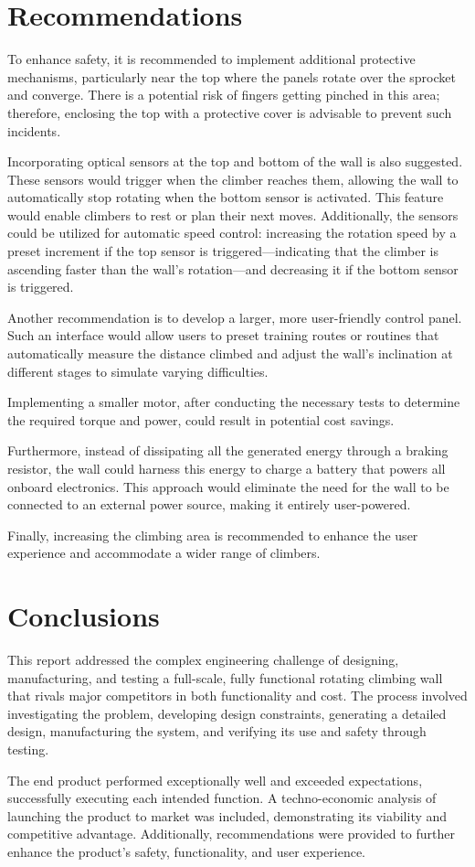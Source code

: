 \chapter{Recommendations}

To enhance safety, it is recommended to implement additional protective mechanisms, particularly near the top where the panels rotate over the sprocket and converge. There is a potential risk of fingers getting pinched in this area; therefore, enclosing the top with a protective cover is advisable to prevent such incidents.

Incorporating optical sensors at the top and bottom of the wall is also suggested. These sensors would trigger when the climber reaches them, allowing the wall to automatically stop rotating when the bottom sensor is activated. This feature would enable climbers to rest or plan their next moves. Additionally, the sensors could be utilized for automatic speed control: increasing the rotation speed by a preset increment if the top sensor is triggered—indicating that the climber is ascending faster than the wall's rotation—and decreasing it if the bottom sensor is triggered.

Another recommendation is to develop a larger, more user-friendly control panel. Such an interface would allow users to preset training routes or routines that automatically measure the distance climbed and adjust the wall's inclination at different stages to simulate varying difficulties.

Implementing a smaller motor, after conducting the necessary tests to determine the required torque and power, could result in potential cost savings.

Furthermore, instead of dissipating all the generated energy through a braking resistor, the wall could harness this energy to charge a battery that powers all onboard electronics. This approach would eliminate the need for the wall to be connected to an external power source, making it entirely user-powered.

Finally, increasing the climbing area is recommended to enhance the user experience and accommodate a wider range of climbers.

\chapter{Conclusions}

This report addressed the complex engineering challenge of designing, manufacturing, and testing a full-scale, fully functional rotating climbing wall that rivals major competitors in both functionality and cost. The process involved investigating the problem, developing design constraints, generating a detailed design, manufacturing the system, and verifying its use and safety through testing.

The end product performed exceptionally well and exceeded expectations, successfully executing each intended function. A techno-economic analysis of launching the product to market was included, demonstrating its viability and competitive advantage. Additionally, recommendations were provided to further enhance the product's safety, functionality, and user experience.
